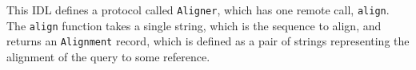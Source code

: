 \documentclass[11pt,proposal]{ucthesis}
\begin{document}
This IDL defines a protocol called \texttt{Aligner}, which has one remote call, \texttt{align}. The \texttt{align} function takes a single string, which is the sequence to align, and returns an \texttt{Alignment} record, which is defined as a pair of strings representing the alignment of the query to some reference.


    
        
        
        
    
    
    
    
    







        
        
        
        
    
    
\end{document}
